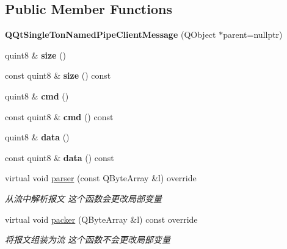\subsection*{Public Member Functions}
\begin{DoxyCompactItemize}
\item 
\mbox{\label{class_q_qt_single_ton_named_pipe_client_message_afaaaef310edf195c0869dee6138f8543}} 
{\bfseries Q\+Qt\+Single\+Ton\+Named\+Pipe\+Client\+Message} (Q\+Object $\ast$parent=nullptr)
\item 
\mbox{\label{class_q_qt_single_ton_named_pipe_client_message_a2fab2a515d940fcad5f776e86e747a63}} 
quint8 \& {\bfseries size} ()
\item 
\mbox{\label{class_q_qt_single_ton_named_pipe_client_message_a79dbd5153b3359f32c36b083940e5efd}} 
const quint8 \& {\bfseries size} () const
\item 
\mbox{\label{class_q_qt_single_ton_named_pipe_client_message_aef3af86d11f40c47f3bd558b9b595451}} 
quint8 \& {\bfseries cmd} ()
\item 
\mbox{\label{class_q_qt_single_ton_named_pipe_client_message_ac3ef0a80fb10c870745c980921961de6}} 
const quint8 \& {\bfseries cmd} () const
\item 
\mbox{\label{class_q_qt_single_ton_named_pipe_client_message_a8d808b29d30841b421e6c9f16963a419}} 
quint8 \& {\bfseries data} ()
\item 
\mbox{\label{class_q_qt_single_ton_named_pipe_client_message_af761a8fc786317ff5e627e9c6f0ff75e}} 
const quint8 \& {\bfseries data} () const
\item 
virtual void \mbox{\hyperlink{class_q_qt_single_ton_named_pipe_client_message_ab1789ea9a8ccb2829a79c94131f88c5b}{parser}} (const Q\+Byte\+Array \&l) override
\begin{DoxyCompactList}\small\item\em 从流中解析报文 这个函数会更改局部变量 \end{DoxyCompactList}\item 
virtual void \mbox{\hyperlink{class_q_qt_single_ton_named_pipe_client_message_a03f8f20ff09f6e531843dbc55304c49b}{packer}} (Q\+Byte\+Array \&l) const override
\begin{DoxyCompactList}\small\item\em 将报文组装为流 这个函数不会更改局部变量 \end{DoxyCompactList}\end{DoxyCompactItemize}


